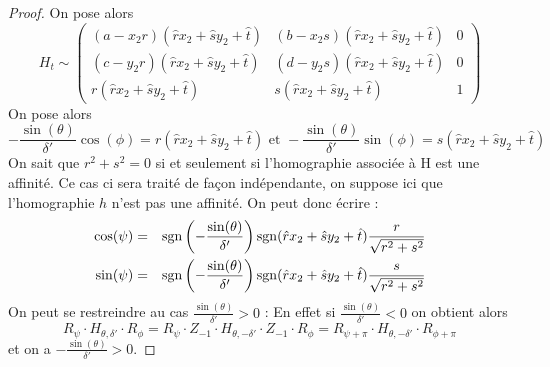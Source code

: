 \begin{proof}
On pose alors
\begin{equation*}
H_t
  \sim 
  \begin{pmatrix}
 (a-x_2 r)(\hat r x_2 + \hat s y_2 +\hat t)&(b-x_2 s)(\hat r x_2 + \hat s y_2 +\hat t)& 0\\
  (c-y_2 r)(\hat r x_2 + \hat s y_2 +\hat t)&(d-y_2 s)(\hat r x_2 + \hat s y_2 +\hat t)& 0\\
  r(\hat r x_2 + \hat s y_2 +\hat t) & s(\hat r x_2 + \hat s y_2 +\hat t) &1
  \end{pmatrix} 
\end{equation*}
On pose alors 
 \begin{equation*}
 -\frac{\sin(\theta)}{\delta'}\cos(\phi)=r(\hat r x_2 + \hat s y_2 +\hat t)\text{ et } -\frac{\sin(\theta)}{\delta'}\sin(\phi)=s(\hat r x_2 + \hat s y_2 +\hat t)
 \end{equation*}
 On sait que $r^{2}+s^{2}=0$ si et seulement si l'homographie associée à H est une affinité. Ce cas ci sera traité de façon indépendante, on suppose ici que l'homographie $h$ n'est pas une affinité. On peut donc écrire :
 \begin{eqnarray*}
 \cos(\psi) &=& \operatorname{sgn}\left(-\frac{\sin(\theta)}{ \delta'}\right)\operatorname{sgn}(\hat r x_2 + \hat s y_2 +\hat t)\frac{r}{\sqrt{r^{2}+s^{2}}}\\
 \sin(\psi) &=& \operatorname{sgn}\left(-\frac{\sin(\theta)}{ \delta'}\right)\operatorname{sgn}(\hat r x_2 + \hat s y_2 +\hat t)\frac{s}{\sqrt{r^{2}+s^{2}}}
 \end{eqnarray*}
 On peut se restreindre au cas $\frac{\sin(\theta)}{\delta'}>0$ :
 En effet si $\frac{\sin(\theta)}{\delta'}<0$ on obtient alors
 \begin{equation*}
 R_{\psi} \cdot H_{\theta,\delta'} \cdot R_{\phi}=R_{\psi} \cdot Z_{-1}\cdot H_{\theta,-\delta'}\cdot Z_{-1} \cdot R_{\phi}= R_{\psi+\pi} \cdot H_{\theta,-\delta'}\cdot R_{\phi+\pi}
 \end{equation*}
 et on a $-\frac{\sin(\theta)}{\delta'}>0$.



\end{proof}
